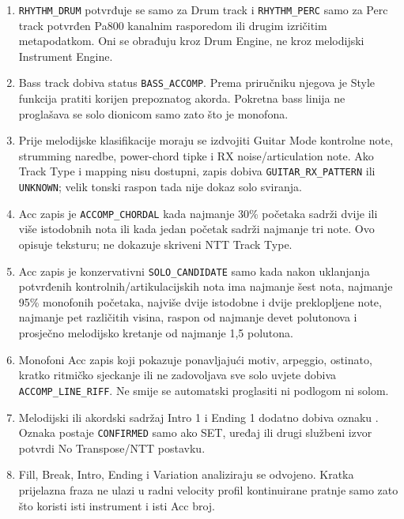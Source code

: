 \documentclass[11pt]{article}
\begin{document}
\begin{enumerate}[label=T\arabic*.]
    \item \texttt{RHYTHM\_DRUM} potvrđuje se samo za Drum track i
    \texttt{RHYTHM\_PERC} samo za Perc track potvrđen Pa800 kanalnim rasporedom
    ili drugim izričitim metapodatkom. Oni se obrađuju kroz Drum Engine, ne kroz
    melodijski Instrument Engine.

    \item Bass track dobiva status \texttt{BASS\_ACCOMP}. Prema priručniku
    njegova je Style funkcija pratiti korijen prepoznatog akorda. Pokretna bass
    linija ne proglašava se solo dionicom samo zato što je monofona.

    \item Prije melodijske klasifikacije moraju se izdvojiti Guitar Mode
    kontrolne note, strumming naredbe, power-chord tipke i RX noise/articulation
    note. Ako Track Type i mapping nisu dostupni, zapis dobiva
    \texttt{GUITAR\_RX\_PATTERN} ili \texttt{UNKNOWN}; velik tonski raspon tada
    nije dokaz solo sviranja.

    \item Acc zapis je \texttt{ACCOMP\_CHORDAL} kada najmanje 30\% početaka
    sadrži dvije ili više istodobnih nota ili kada jedan početak sadrži najmanje
    tri note. Ovo opisuje teksturu; ne dokazuje skriveni NTT Track Type.

    \item Acc zapis je konzervativni \texttt{SOLO\_CANDIDATE} samo kada nakon
    uklanjanja potvrđenih kontrolnih/artikulacijskih nota ima najmanje šest
    nota, najmanje 95\% monofonih početaka, najviše dvije istodobne i dvije
    preklopljene note, najmanje pet različitih visina, raspon od najmanje devet
    polutonova i prosječno melodijsko kretanje od najmanje 1,5 polutona.

    \item Monofoni Acc zapis koji pokazuje ponavljajući motiv, arpeggio,
    ostinato, kratko ritmičko sjeckanje ili ne zadovoljava sve solo uvjete dobiva
    \texttt{ACCOMP\_LINE\_RIFF}. Ne smije se automatski proglasiti ni podlogom
    ni solom.

    \item Melodijski ili akordski sadržaj Intro 1 i Ending 1 dodatno dobiva
    oznaku . Oznaka postaje
    \texttt{CONFIRMED} samo ako SET, uređaj ili drugi službeni izvor potvrdi
    No Transpose/NTT postavku.

    \item Fill, Break, Intro, Ending i Variation analiziraju se odvojeno.
    Kratka prijelazna fraza ne ulazi u radni velocity profil kontinuirane
    pratnje samo zato što koristi isti instrument i isti Acc broj.


\end{enumerate}
\end{document}
